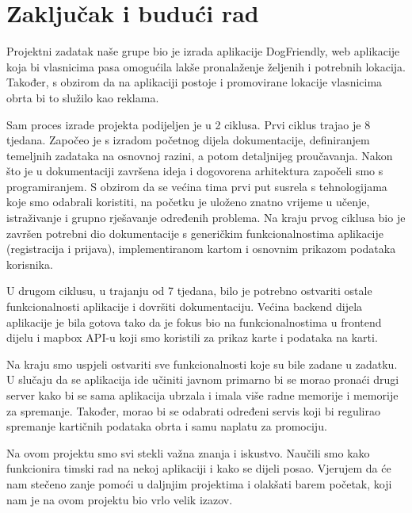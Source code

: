 \chapter{Zaključak i budući rad}

    Projektni zadatak naše grupe bio je izrada aplikacije DogFriendly, web aplikacije koja bi vlasnicima pasa omogućila lakše pronalaženje željenih i potrebnih lokacija. Također, s obzirom da na aplikaciji postoje i promovirane lokacije vlasnicima obrta bi to služilo kao reklama. \newline

    Sam proces izrade projekta podijeljen je u 2 ciklusa. Prvi ciklus trajao je 8 tjedana. Započeo je s izradom početnog dijela dokumentacije, definiranjem temeljnih zadataka na osnovnoj razini, a potom detaljnijeg proučavanja. Nakon što je u dokumentaciji završena ideja i dogovorena arhitektura započeli smo s programiranjem. S obzirom da se većina tima prvi put susrela s tehnologijama koje smo odabrali koristiti, na početku je uloženo znatno vrijeme u učenje, istraživanje i grupno rješavanje određenih problema. Na kraju prvog ciklusa bio je završen potrebni dio dokumentacije s generičkim funkcionalnostima aplikacije (registracija i prijava), implementiranom kartom i osnovnim prikazom podataka korisnika. \newline

    U drugom ciklusu, u trajanju od 7 tjedana, bilo je potrebno ostvariti ostale funkcionalnosti aplikacije i dovršiti dokumentaciju. Većina backend dijela aplikacije je bila gotova tako da je fokus bio na funkcionalnostima u frontend dijelu i mapbox API-u koji smo koristili za prikaz karte i podataka na karti. \newline

    Na kraju smo uspjeli ostvariti sve funkcionalnosti koje su bile zadane u zadatku. U slučaju da se aplikacija ide učiniti javnom primarno bi se morao pronaći drugi server kako bi se sama aplikacija ubrzala i imala više radne memorije i memorije za spremanje. Također, morao bi se odabrati određeni servis koji bi regulirao spremanje kartičnih podataka obrta i samu naplatu za promociju. \newline

    Na ovom projektu smo svi stekli važna znanja i iskustvo. Naučili smo kako funkcionira timski rad na nekoj aplikaciji i kako se dijeli posao. Vjerujem da će nam stečeno zanje pomoći u daljnjim projektima i olakšati barem početak, koji nam je na ovom projektu bio vrlo velik izazov.

    
    